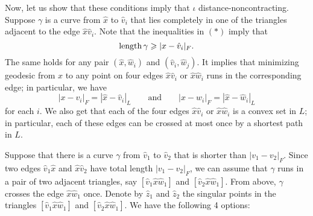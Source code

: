 \documentclass{article}
\begin{document}
Now, let us show that these conditions imply that $\iota$ distance-noncontracting.
Suppose $\gamma$ is a curve from $\hat x$ to $\hat v_i$ that lies completely in one of the triangles adjacent to the edge $\hat x \hat v_i$.
Note that the inequalities in $({*})$ imply that 
\[\mathop{\rm length}\nolimits \gamma\geqslant | x -\hat v_i|_F.\]
The same holds for any pair $(\hat x,\hat w_i)$ and $(\hat v_i,\hat w_j)$.
It implies that minimizing geodesic from $x$ to any point on four edges $\hat x \hat v_i$ or $\hat x \hat w_i$ runs in the corresponding edge; in particular, we have 
\[|x- v_i|_F=|\hat x- \hat v_i|_L\qquad\text{and}\qquad |x- w_i|_F=|\hat x- \hat w_i|_L\]
for each $i$.
We also get that each of the four edges $\hat x \hat v_i$ or $\hat x \hat w_i$ is a convex set in $L$;
in particular, each of these edges can be crossed at most once by a shortest path in $L$. 

Suppose that there is a curve $\gamma$ from $\hat v_1$ to $\hat v_2$ that is shorter than $|v_1-v_2|_F$.
Since two edges $\hat v_1\hat x$ and $\hat x\hat v_2$ have total length $|v_1-v_2|_F$,
we can assume that $\gamma$ runs in a pair of two adjacent triangles, say $[\hat v_1\hat x\hat w_1]$ and $[\hat v_2\hat x\hat w_1]$.
From above, $\gamma$ crosses the edge $\hat x\hat w_1$ once.
Denote by $\hat z_1$ and $\hat z_2$ the singular points in the triangles $[\hat v_1\hat x\hat w_1]$ and $[\hat v_2\hat x\hat w_1]$.
We have the following 4 options: 
\end{document}
